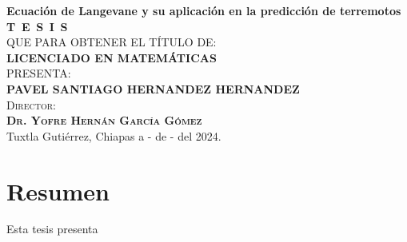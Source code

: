 \documentclass[
  spanish,
  us-letterpaper,
]{scrreprt}
\renewcommand*\contentsname{Tabla de contenidos}
\newcommand\contentsname{Tabla de contenidos}
\theoremstyle{plain}
\theoremstyle{plain}
\theoremstyle{plain}
\theoremstyle{definition}
\theoremstyle{remark}
\begin{document}
\begin{titlepage}
\begin{minipage}[t][0.95\textheight][c]{0.76\textwidth}
            \begin{center}
                {\Large\bfseries Ecuación de Langevane y su aplicación en la predicción de terremotos}\\[2cm]
                \textsc{\huge \textbf{T\, E\, S\, I\, S}}\\[1.5cm]
                \textsc{\large QUE PARA OBTENER EL TÍTULO DE:}\\[0.3cm]
                \textbf{\textsc{LICENCIADO EN MATEMÁTICAS}}\\[1.5cm]
                \textsc{\large PRESENTA:}\\[0.3cm]
                \textbf{\textsc{\large {PAVEL SANTIAGO HERNANDEZ HERNANDEZ}}}\\[2cm]
                {\large\scshape Director:\\[0.3cm]
                {\textbf{\large Dr. Yofre Hernán García Gómez }}}\\[2.0cm]
                \large{Tuxtla Gutiérrez, Chiapas a - de - del 2024.}

            \end{center}
\end{minipage}
\end{titlepage}





\renewcommand*\contentsname{Tabla de contenidos}
{
\hypersetup{linkcolor=}
\setcounter{tocdepth}{2}
\tableofcontents
}


\chapter*{Resumen}\label{resumen}


Esta tesis presenta

\end{document}
